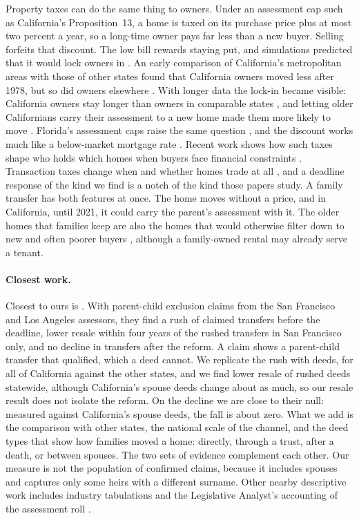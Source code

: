 Property taxes can do the same thing to owners. Under an assessment cap such as California's Proposition~13, a home is taxed on its purchase price plus at most two percent a year, so a long-time owner pays far less than a new buyer. Selling forfeits that discount. The low bill rewards staying put, and simulations predicted that it would lock owners in \citep{osullivansextonsheffrin1995property}. An early comparison of California's metropolitan areas with those of other states found that California owners moved less after 1978, but so did owners elsewhere \citep{nagy1997proposition}. With longer data the lock-in became visible: California owners stay longer than owners in comparable states \citep{wasiwhite2005prop13}, and letting older Californians carry their assessment to a new home made them more likely to move \citep{ferreira2010takeit}. Florida's assessment caps raise the same question \citep{ihlanfeldt2011caps}, and the discount works much like a below-market mortgage rate \citep{ferreiragyourkotracy2010busts,fonsecaliu2024lockin}. Recent work shows how such taxes shape who holds which homes when buyers face financial constraints \citep{covenetal2024proptax}. Transaction taxes change when and whether homes trade at all \citep{kopczukmunroe2015mansion,hilberlyytikainen2017transfer,bestkleven2018notches,slemrodwebershan2017dc}, and a deadline response of the kind we find is a notch of the kind those papers study. A family transfer has both features at once. The home moves without a price, and in California, until 2021, it could carry the parent's assessment with it. The older homes that families keep are also the homes that would otherwise filter down to new and often poorer buyers \citep{rosenthal2014filtering}, although a family-owned rental may already serve a tenant.

\paragraph{Closest work.} Closest to ours is \citet{bakerkimbiswas2026inherited}. With parent-child exclusion claims from the San Francisco and Los Angeles assessors, they find a rush of claimed transfers before the deadline, lower resale within four years of the rushed transfers in San Francisco only, and no decline in transfers after the reform. A claim shows a parent-child transfer that qualified, which a deed cannot. We replicate the rush with deeds, for all of California against the other states, and we find lower resale of rushed deeds statewide, although California's spouse deeds change about as much, so our resale result does not isolate the reform. On the decline we are close to their null: measured against California's spouse deeds, the fall is about zero. What we add is the comparison with other states, the national scale of the channel, and the deed types that show how families moved a home: directly, through a trust, after a death, or between spouses. The two sets of evidence complement each other. Our measure is not the population of confirmed claims, because it includes spouses and captures only some heirs with a different surname. Other nearby descriptive work includes industry tabulations \citep{delventhal2026inherited} and the Legislative Analyst's accounting of the assessment roll \citep{lao2017inheritance}.

